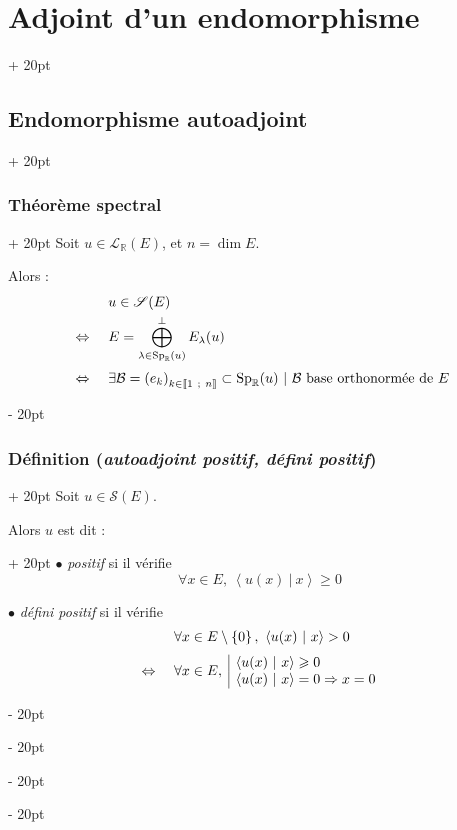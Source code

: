 \documentclass[a4paper, 12pt, twoside]{article}
\newcommand{\R}{\mathbb{R}} %
\newcommand{\nset}[2]{\left\llbracket #1\ ;\ #2 \right\rrbracket}
\newcommand{\lr}[1]{\left( #1 \right)}
\newcommand{\set}[1]{\left\{ #1 \right\}}
\newcommand{\lrangle}[1]{\left\langle #1 \right\rangle}
\newcommand{\ssi}{\ \Leftrightarrow \ }
\renewcommand{\ge}{\geqslant}
\newcommand{\ps}[2]{\lrangle{#1\ |\ #2}}
\newcommand{\ind}[1][20pt]{\advance\leftskip + #1}
\newcommand{\deind}[1][20pt]{\advance\leftskip - #1}
\newenvironment{indt}[2][20pt]{#2 \par \ind[#1]}{\par \deind} %
\begin{document}
\begin{indt}{\section{Adjoint d'un endomorphisme}}
\begin{indt}{\subsection{Endomorphisme autoadjoint}}
            \vspace{12pt}
            
            \begin{indt}{\subsubsection{Théorème spectral}}
                Soit $u \in \mathcal L_\R(E)$, et $n = \dim E$.

                Alors :
                \[
                    \begin{array}{cl}
                        & u \in \mathscr S(E)
                        \vspace{3pt}
                        \\
                        \ssi& \displaystyle
                        E = \bigoplus_{\lambda \in \mathrm{Sp}_\R(u)}^\perp E_\lambda(u)
                        \vspace{6pt}
                        \\
                        \ssi&
                        \exists \mathcal B = \lr{e_k}_{k \in \nset 1 n} \subset \mathrm{Sp}_\R(u)\ |\ \mathcal B\ \text{base orthonormée de}\ E
                    \end{array}
                \]
            \end{indt}

            \begin{indt}{\subsubsection{Définition (\textit{autoadjoint positif, défini positif})}}
                Soit $u \in \mathscr S(E)$.

                \begin{indt}{Alors $u$ est dit :}
                    $\bullet$ \emph{positif} si il vérifie
                    \[
                        \forall x \in E,\ \ps{u(x)} x \ge 0
                    \]

                    $\bullet$ \emph{défini positif} si il vérifie
                    \[
                        \begin{array}{cl}
                            & \forall x \in E \setminus \set 0,\
                            \ps{u(x)} x > 0
                            \vspace{6pt}
                            \\
                            \ssi& \forall x \in E,\
                            \begin{array}{|l}
                                \ps{u(x)} x \ge 0
                                \\
                                \ps{u(x)} x = 0 \Rightarrow x = 0
                            \end{array}
                        \end{array}
                    \]
                \end{indt}


\end{indt}
\end{indt}
\end{indt}
\end{document}
